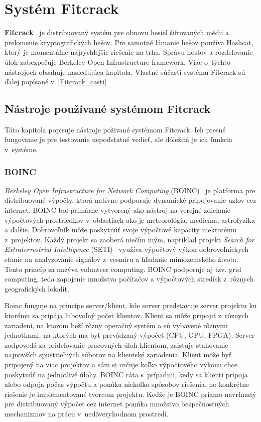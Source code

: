 \chapter{Systém Fitcrack} 
\label{Fitcrack}
\textbf{Fitcrack}~\cite{TR_TARZAN} je distribuovaný systém pre obnovu hesiel šifrovaných médii a prelomenie kryptografických hešov.
Pre samotné lámanie hešov používa Hashcat, ktorý je momentálne najrýchlejšie riešenie na trhu.
Správu hosťov a rozdeľovanie úloh zabezpečuje Berkeley Open Infrastructure framework.
Viac o~týchto nástrojoch obsahuje nasledujúca kapitola.
Vlastné súčasti systému Fitcrack sú ďalej popísané v~\ref{Fitcrack_casti}

\section{Nástroje používané systémom Fitcrack}
Táto kapitola popisuje nástroje poživané systémom Fitcrack.
Ich presné fungovanie je pre testovanie nepodstatné vedieť, ale dôležitá je ich funkcia v~systéme.

\subsection{BOINC}
\label{boinc}
\textit{Berkeley Open Infrastructure for Network Computing} (BOINC)~\cite{boincintro} je platforma pre distribuované výpočty, ktorá natívne podporuje dynamické pripojovanie uzlov cez internet.
BOINC bol primárne vytvorený ako nástroj na verejné zdieľanie výpočtových  prostriedkov v~oblastiach ako je meteorológia, medicína, astrofyzika a ďalšie.
Dobrovoľník môže poskytnúť svoje výpočtové kapacity niektorému z~projektov.
Každý projekt sa zaoberá niečím iným, napríklad projekt \textit{Search for Extraterrestrial Intelligence} (SETI)~\cite{SETI} využíva výpočtový výkon dobrovoľníckych staníc na analyzovanie signálov z~vesmíru a hľadanie mimozemského života.
Tento princíp sa nazýva volunteer computing.
BOINC podporuje aj tzv. grid computing, teda zapojenie množstva počítačov a výpočtových stredísk z~rôznych geografických lokalít.

Boinc funguje na princípe server/klient, kde server predstavuje server projektu ku ktorému sa pripája ľubovoľný počet klientov.
Klient sa môže pripojiť z~rôznych zariadení, na ktorom beží rôzny operačný systém a sú vybavené rôznymi jednotkami, na ktorých ma byť prevádzaný výpočet (CPU, GPU, FPGA).
Server zodpovedá za prideľovanie pracovných úloh klientom, zaisťuje sťahovanie najnovších spustiteľných súborov na klientské zariadenia.
Klient môže byť pripojený na viac projektov a sám si určuje koľko výpočtového výkonu chce poskytnúť na jednotlivé úlohy.
BOINC ráta s~prípadmi, kedy sa klienti pripoja alebo odpoja počas výpočtu a ponúka niekoľko spôsobov riešenia, no konkrétne riešenie je implementované tvorcom projektu.
Keďže je BOINC priamo navrhnutý pre distribuovaný výpočet cez internet ponúka množstvo bezpečnostných mechanizmov na prácu v~nedôveryhodnom prostredí.

